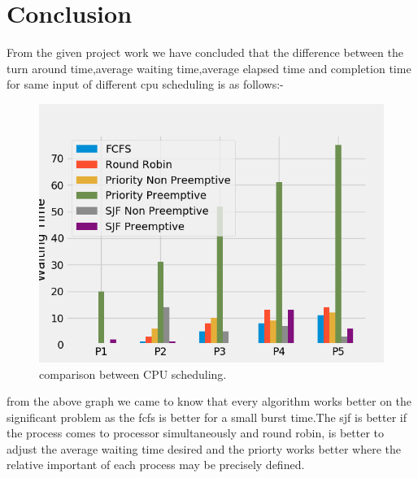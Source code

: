 \documentclass[11pt,a4paper]{report}
\begin{document}
		\section*{Conclusion}
		\vskip 1cm
		\large{{From the given project work we have concluded that the difference between the turn around time,average waiting time,average elapsed time and completion time for same input of different cpu scheduling is as follows:-}
		\vskip 1cm
		\begin{figure}[H]
		    \centering
		    \includegraphics[scale=0.9]{compare.png}
		    \caption{comparison between CPU scheduling.}
		\end{figure}
		\vskip 1cm
		\large{from the above graph we came to know that every algorithm works better on the significant problem as the fcfs is better for a small burst time.The sjf is better if the process comes to processor simultaneously and round robin, is better to adjust the average waiting time desired and the priorty works better  where the relative important of each process may be precisely defined.}
		}
		\vskip 15cm
\end{document}
